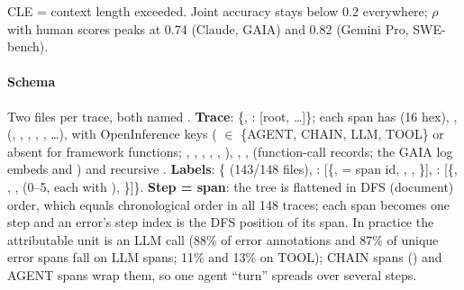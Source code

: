 \begin{center}\small
{}
\end{center}
CLE = context length exceeded. Joint accuracy stays below 0.2 everywhere; $\rho$ with human scores peaks at 0.74 (Claude, GAIA) and 0.82 (Gemini Pro, SWE-bench).

\paragraph{Schema} Two files per trace, both named . \textbf{Trace}: \{, : [root, \ldots]\}; each span has  (16 hex), ,  (, , , , , \ldots),  with OpenInference keys ( $\in$ \{AGENT, CHAIN, LLM, TOOL\} or absent for framework functions; , , , , , ), , ,  (function-call records; the GAIA  log embeds  and ) and recursive . \textbf{Labels}: \{ (143/148 files), : [\{,  = span id, , , \}], : [\{, , ,  (0--5, each with ), \}]\}. \textbf{Step = span}: the tree is flattened in DFS (document) order, which equals chronological order in all 148 traces; each span becomes one step and an error's step index is the DFS position of its  span. In practice the attributable unit is an LLM call (88\% of error annotations and 87\% of unique error spans fall on LLM spans; 11\% and 13\% on TOOL); CHAIN spans () and AGENT spans wrap them, so one agent ``turn'' spreads over several steps.

